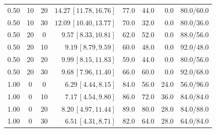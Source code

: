 \begin{center}
\begin{tabular}{cccrrrrr}
0.50 & 10 & 20 & $14.27\,[11.78,16.76]$ & 77.0 & 44.0 & 0.0 & 80.0/60.0 \\
0.50 & 10 & 30 & $12.09\,[10.40,13.77]$ & 70.0 & 32.0 & 0.0 & 80.0/36.0 \\
0.50 & 20 & 0 & $9.57\,[8.33,10.81]$ & 62.0 & 52.0 & 0.0 & 88.0/56.0 \\
0.50 & 20 & 10 & $9.19\,[8.79,9.59]$ & 60.0 & 48.0 & 0.0 & 92.0/48.0 \\
0.50 & 20 & 20 & $9.99\,[8.15,11.83]$ & 59.0 & 44.0 & 0.0 & 80.0/56.0 \\
0.50 & 20 & 30 & $9.68\,[7.96,11.40]$ & 66.0 & 60.0 & 0.0 & 92.0/68.0 \\
1.00 & 0 & 0 & $6.29\,[4.44,8.15]$ & 84.0 & 56.0 & 24.0 & 56.0/96.0 \\
1.00 & 0 & 10 & $7.17\,[4.54,9.80]$ & 86.0 & 72.0 & 36.0 & 84.0/84.0 \\
1.00 & 0 & 20 & $8.20\,[4.97,11.44]$ & 89.0 & 80.0 & 28.0 & 84.0/88.0 \\
1.00 & 0 & 30 & $6.51\,[4.31,8.71]$ & 82.0 & 64.0 & 28.0 & 64.0/84.0 \\
\bottomrule
\end{tabular}
\end{center}
\newpage

